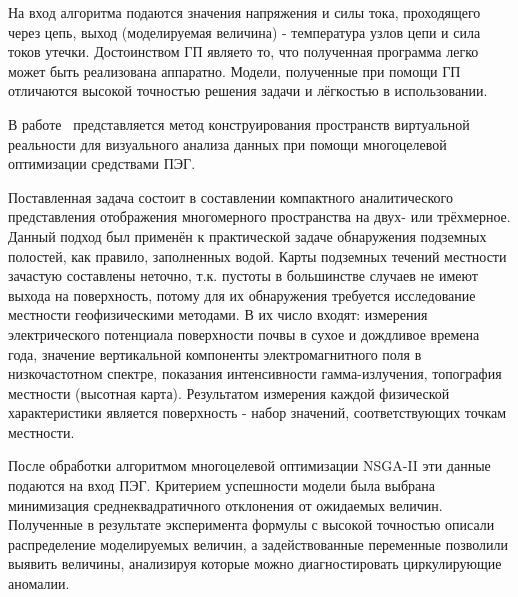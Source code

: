 На вход алгоритма подаются значения напряжения и силы тока, проходящего через цепь, выход (моделируемая величина) - температура узлов цепи и сила токов утечки. Достоинством ГП являето то, что полученная программа легко может быть реализована аппаратно. Модели, полученные при помощи ГП отличаются высокой точностью решения задачи и лёгкостью в использовании.

В работе~\cite{conf/ijcnn/ValdesB06} представляется метод конструирования пространств виртуальной реальности для визуального анализа данных при помощи многоцелевой оптимизации средствами ПЭГ. 

Поставленная задача состоит в составлении компактного аналитического представления отображения многомерного пространства на двух- или трёхмерное. Данный подход был применён к практической задаче обнаружения подземных полостей, как правило, заполненных водой. Карты подземных течений местности зачастую составлены неточно, т.к. пустоты в большинстве случаев не имеют выхода на поверхность, потому для их обнаружения требуется исследование местности геофизическими методами. В их число входят: измерения электрического потенциала поверхности почвы в сухое и дождливое времена года, значение вертикальной компоненты электромагнитного поля в низкочастотном спектре, показания интенсивности гамма-излучения, топография местности (высотная карта). Результатом измерения каждой физической характеристики является поверхность - набор значений, соответствующих точкам местности.

После обработки алгоритмом многоцелевой оптимизации NSGA-II эти данные подаются на вход ПЭГ. Критерием успешности модели была выбрана минимизация среднеквадратичного отклонения от ожидаемых величин.
Полученные в результате эксперимента формулы с высокой точностью описали распределение моделируемых величин, а задействованные переменные позволили выявить величины, анализируя которые можно диагностировать циркулирующие аномалии.

